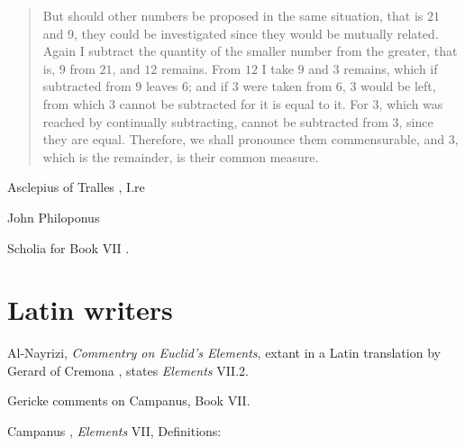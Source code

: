 \documentclass{article}
\begin{document}
\begin{quote}
But should other numbers be proposed in the same situation, that is $21$ and $9$, they could be investigated since they would be mutually related.
Again I subtract the quantity of the smaller number from the greater, that is, $9$ from $21$, and $12$ remains. From $12$ I take $9$ and $3$ remains, which if subtracted
from $9$ leaves $6$; and if $3$ were taken from $6$, $3$ would be left, from which $3$ cannot be subtracted for it is equal to it. For $3$, which was reached
by continually subtracting, cannot be subtracted from $3$, since they are equal. Therefore, we shall pronounce them commensurable, and $3$, which is the remainder,
is their common measure.
\end{quote}

Asclepius of Tralles \cite[pp.~44, 78]{taran}, I.re

John Philoponus \cite{philoponus}


Scholia for Book VII \cite{euclidisV}.




\section{Latin writers}
Al-Nayrizi, {\em Commentry on Euclid's Elements}, extant in a Latin translation by Gerard of Cremona \cite[pp.~190--191]{anaritius}, states
{\em Elements} VII.2.

Gericke \cite[p.~105]{gericke} comments on Campanus, Book VII.

Campanus \cite[pp.~230--231]{campanusI}, {\em Elements} VII, Definitions:
\end{document}
